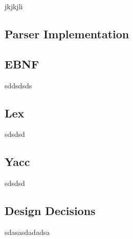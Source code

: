 \documentclass[]{article}
\begin{document}
jkjkjli

\begin{center}
	\section*{Parser Implementation}
\end{center}

\vspace*{0.8cm}
\subsection*{EBNF}

sddsdsds

\subsection*{Lex}

sdsdsd

\subsection*{Yacc}

sdsdsd

\begin{center}
	\section*{Design Decisions}
\end{center}

sdasasdadadsa


\break
\setlength{}
\printbibliography[title={References}]

\end{document}
